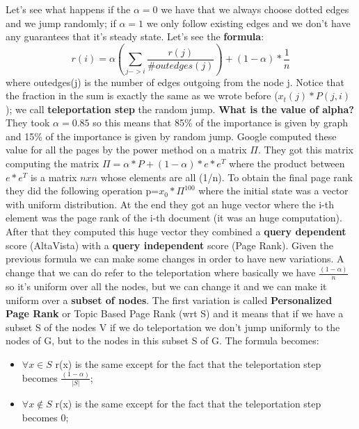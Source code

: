 Let's see what happens if the $\alpha=0$ we have that we always choose dotted edges and we jump randomly; if $\alpha=1$ we only follow existing edges and we don't have any guarantees that it's steady state.\newline
Let's see the \textbf{formula}:
\begin{equation}
    r(i)=\alpha(\sum_{j->i}\frac{r(j)}{\#outedges(j)})+(1-\alpha)*\frac{1}{n}
\end{equation}
where outedges(j) is the number of edges outgoing from the node j.\newline
Notice that the fraction in the sum is exactly the same as we wrote before ($x_t(j)*P(j,i)$); we call \textbf{teleportation step} the random jump.\newline
\textbf{What is the value of alpha?} They took $\alpha=0.85$ so this means that 85\% of the importance is given by graph and 15\% of the importance is given by random jump.\newline
Google computed these value for all the pages by the power method on a matrix $\Pi$. They got this matrix computing the matrix $\Pi = \alpha * P + (1-\alpha)*e*e^T$ where the product between $e*e^T$ is a matrix $nxn$ whose elements are all (1/n).\newline
To obtain the final page rank they did the following operation p=$x_0*\Pi^{100}$ where the initial state was a vector with uniform distribution. At the end they got an huge vector where the i-th element was the page rank of the i-th document (it was an huge computation).\newline
After that they computed this huge vector they combined a \textbf{query dependent} score (AltaVista) with a \textbf{query independent} score (Page Rank).\newline
Given the previous formula we can make some changes in order to have new variations. A change that we can do refer to the teleportation where basically we have $\frac{(1-\alpha)}{n}$ so it's uniform over all the nodes, but we can change it and we can make it uniform over a \textbf{subset of nodes}.\newline
The first variation is called \textbf{Personalized Page Rank} or Topic Based Page Rank (wrt S) and it means that if we have a subset S of the nodes V if we do teleportation we don't jump uniformly to the nodes of G, but to the nodes in this subset S of G.\newline
The formula becomes:
\begin{itemize}
    \item $\forall x \in S$ r(x) is the same except for the fact that the teleportation step becomes $\frac{(1-\alpha)}{|S|}$;
    \item $\forall x \notin S$ r(x) is the same except for the fact that the teleportation step becomes 0;
\end{itemize}
